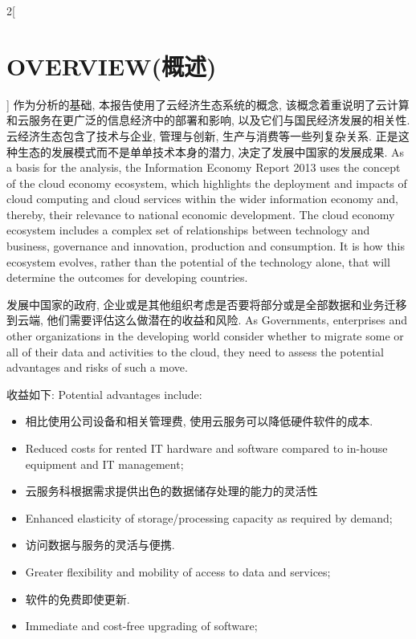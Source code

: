 \documentclass[a4paper, UTF8, 12pt]{article}
\begin{document}
\begin{paracol}{2}[\section{OVERVIEW(概述)}]
    \switchcolumn*
    作为分析的基础, 本报告使用了云经济生态系统的概念, 该概念着重说明了云计算和云服务在更广泛的信息经济中的部署和影响, 以及它们与国民经济发展的相关性. 云经济生态包含了技术与企业, 管理与创新, 生产与消费等一些列复杂关系. 正是这种生态的发展模式而不是单单技术本身的潜力, 决定了发展中国家的发展成果.
    \switchcolumn
    As a basis for the analysis, the Information Economy Report 2013 uses the concept of the cloud economy ecosystem, which highlights the deployment and impacts of cloud computing and cloud services within the wider information economy and, thereby, their relevance to national economic development. The cloud economy ecosystem includes a complex set of relationships between technology and business, governance and innovation, production and consumption. It is how this ecosystem evolves, rather than the potential of the technology alone, that will determine the outcomes for developing countries.

    \switchcolumn*
    发展中国家的政府, 企业或是其他组织考虑是否要将部分或是全部数据和业务迁移到云端, 他们需要评估这么做潜在的收益和风险.
    \switchcolumn
    As Governments, enterprises and other organizations in the developing world consider whether to migrate some or all of their data and activities to the cloud, they need to assess the potential advantages and risks of such a move. 

    \switchcolumn*
    收益如下:
    \switchcolumn
    Potential advantages include:
    \begin{itemize}
        \switchcolumn*
        \item 相比使用公司设备和相关管理费, 使用云服务可以降低硬件软件的成本.
        \switchcolumn
        \item Reduced costs for rented IT hardware and software compared to in-house equipment and IT management; 
        
        \switchcolumn*
        \item 云服务科根据需求提供出色的数据储存处理的能力的灵活性
        \switchcolumn
        \item Enhanced elasticity of storage/processing capacity as required by demand;
        
        \switchcolumn*
        \item 访问数据与服务的灵活与便携.
        \switchcolumn
        \item Greater flexibility and mobility of access to data and services;
        
        \switchcolumn*
        \item 软件的免费即使更新.
        \switchcolumn
        \item Immediate and cost-free upgrading of software; 
        

\end{itemize}
\end{paracol}
\end{document}
